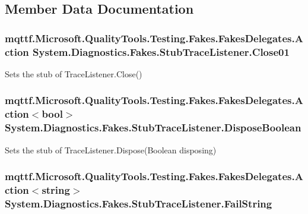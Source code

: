 \subsection{Member Data Documentation}
\hypertarget{class_system_1_1_diagnostics_1_1_fakes_1_1_stub_trace_listener_a5d9002fb8d23819606a3136f99da13b5}{
\subsubsection[{Close01}]{\setlength{\rightskip}{0pt plus 5cm}mqttf.\-Microsoft.\-Quality\-Tools.\-Testing.\-Fakes.\-Fakes\-Delegates.\-Action System.\-Diagnostics.\-Fakes.\-Stub\-Trace\-Listener.\-Close01}}\label{class_system_1_1_diagnostics_1_1_fakes_1_1_stub_trace_listener_a5d9002fb8d23819606a3136f99da13b5}


Sets the stub of Trace\-Listener.\-Close()

\hypertarget{class_system_1_1_diagnostics_1_1_fakes_1_1_stub_trace_listener_af081e12ae67dc44d02d2b635c4497c7c}{
\subsubsection[{Dispose\-Boolean}]{\setlength{\rightskip}{0pt plus 5cm}mqttf.\-Microsoft.\-Quality\-Tools.\-Testing.\-Fakes.\-Fakes\-Delegates.\-Action$<$bool$>$ System.\-Diagnostics.\-Fakes.\-Stub\-Trace\-Listener.\-Dispose\-Boolean}}\label{class_system_1_1_diagnostics_1_1_fakes_1_1_stub_trace_listener_af081e12ae67dc44d02d2b635c4497c7c}


Sets the stub of Trace\-Listener.\-Dispose(\-Boolean disposing)

\hypertarget{class_system_1_1_diagnostics_1_1_fakes_1_1_stub_trace_listener_a18f23f049413e25e86946eb755d8435c}{
\subsubsection[{Fail\-String}]{\setlength{\rightskip}{0pt plus 5cm}mqttf.\-Microsoft.\-Quality\-Tools.\-Testing.\-Fakes.\-Fakes\-Delegates.\-Action$<$string$>$ System.\-Diagnostics.\-Fakes.\-Stub\-Trace\-Listener.\-Fail\-String}}\label{class_system_1_1_diagnostics_1_1_fakes_1_1_stub_trace_listener_a18f23f049413e25e86946eb755d8435c}



